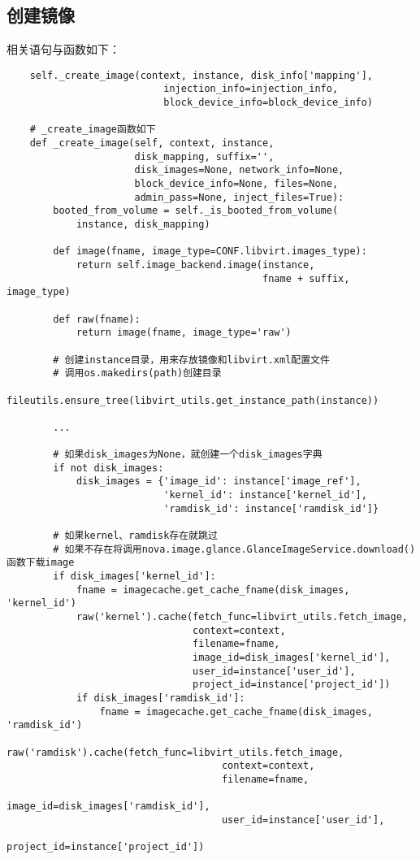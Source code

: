 \documentclass[a4paper,left=1.5cm,right=1.5cm,11pt]{article}
\begin{document}
\subsection{创建镜像}
	相关语句与函数如下：
	\begin{lstlisting}
	self._create_image(context, instance, disk_info['mapping'],
                           injection_info=injection_info,
                           block_device_info=block_device_info)

	# _create_image函数如下
	def _create_image(self, context, instance,
                      disk_mapping, suffix='',
                      disk_images=None, network_info=None,
                      block_device_info=None, files=None,
                      admin_pass=None, inject_files=True):
        booted_from_volume = self._is_booted_from_volume(
            instance, disk_mapping)

        def image(fname, image_type=CONF.libvirt.images_type):
            return self.image_backend.image(instance,
                                            fname + suffix, image_type)

        def raw(fname):
            return image(fname, image_type='raw')

        # 创建instance目录，用来存放镜像和libvirt.xml配置文件
		# 调用os.makedirs(path)创建目录
        fileutils.ensure_tree(libvirt_utils.get_instance_path(instance))

        ...

		# 如果disk_images为None，就创建一个disk_images字典
        if not disk_images:
            disk_images = {'image_id': instance['image_ref'],
                           'kernel_id': instance['kernel_id'],
                           'ramdisk_id': instance['ramdisk_id']}

		# 如果kernel、ramdisk存在就跳过
		# 如果不存在将调用nova.image.glance.GlanceImageService.download()函数下载image
        if disk_images['kernel_id']:
            fname = imagecache.get_cache_fname(disk_images, 'kernel_id')
            raw('kernel').cache(fetch_func=libvirt_utils.fetch_image,
                                context=context,
                                filename=fname,
                                image_id=disk_images['kernel_id'],
                                user_id=instance['user_id'],
                                project_id=instance['project_id'])
            if disk_images['ramdisk_id']:
                fname = imagecache.get_cache_fname(disk_images, 'ramdisk_id')
                raw('ramdisk').cache(fetch_func=libvirt_utils.fetch_image,
                                     context=context,
                                     filename=fname,
                                     image_id=disk_images['ramdisk_id'],
                                     user_id=instance['user_id'],
                                     project_id=instance['project_id'])


\end{lstlisting}
\end{document}
